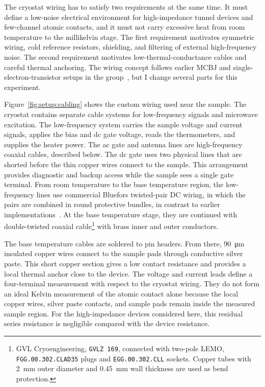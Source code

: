             The cryostat wiring has to satisfy two requirements at the same time. It must define a low-noise electrical environment for high-impedance tunnel devices and few-channel atomic contacts, and it must not carry excessive heat from room temperature to the millikelvin stage. The first requirement motivates symmetric wiring, cold reference resistors, shielding, and filtering of external high-frequency noise. The second requirement motivates low-thermal-conductance cables and careful thermal anchoring. The wiring concept follows earlier MCBJ and single-electron-transistor setups in the group~\cite{lorenz_wechselspiel_2018,prestel_magnetic_2020}, but I change several parts for this experiment.

            Figure~\ref{fig:setup:cabling} shows the custom wiring used near the sample. The cryostat contains separate cable systems for low-frequency signals and microwave excitation. The low-frequency system carries the sample voltage and current signals, applies the bias and dc gate voltage, reads the thermometers, and supplies the heater power. The ac gate and antenna lines are high-frequency coaxial cables, described below. The dc gate uses two physical lines that are shorted before the thin copper wires connect to the sample. This arrangement provides diagnostic and backup access while the sample sees a single gate terminal. From room temperature to the base temperature region, the low-frequency lines use commercial Bluefors twisted-pair DC wiring, in which the pairs are combined in round protective bundles, in contrast to earlier implementations~\cite{prestel_magnetic_2020,raif_electronic_2024}. At the base temperature stage, they are continued with double-twisted coaxial cable\footnote{GVL Cryoengineering, \texttt{GVLZ 169}, connected with two-pole LEMO, \texttt{FGG.00.302.CLAD35} plugs and \texttt{EGG.00.302.CLL} sockets. Copper tubes with \qty{2}{\milli\meter} outer diameter and \qty{0.45}{\milli\meter} wall thickness are used as bend protection.} with brass inner and outer conductors.

            The base temperature cables are soldered to pin headers. From there, \qty{90}{\micro\meter} insulated copper wires connect to the sample pads through conductive silver paste. This short copper section gives a low contact resistance and provides a local thermal anchor close to the device. The voltage and current leads define a four-terminal measurement with respect to the cryostat wiring. They do not form an ideal Kelvin measurement of the atomic contact alone because the local copper wires, silver paste contacts, and sample pads remain inside the measured sample region. For the high-impedance devices considered here, this residual series resistance is negligible compared with the device resistance.

